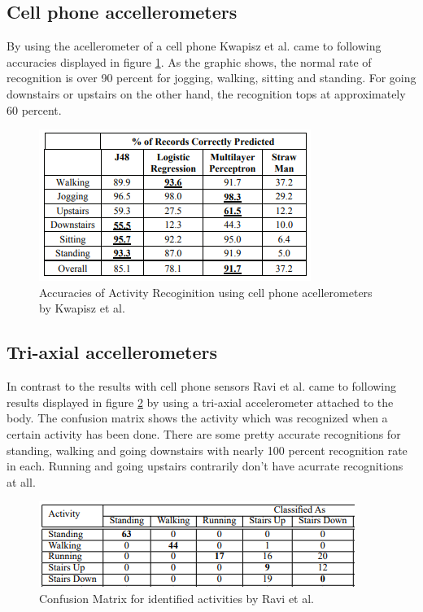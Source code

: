 \documentclass[conference]{IEEEtran}
\begin{document}
\subsection{Cell phone accellerometers}
By using the acellerometer of a cell phone Kwapisz et al. came to following accuracies displayed in figure \ref{fig:accurracies_cell_phone}. As the graphic shows, the normal rate of recognition is over 90 percent for jogging, walking, sitting and standing. For going downstairs or upstairs on the other hand, the recognition tops at approximately 60 percent.
\begin{figure}[!htb]
  \includegraphics[width=\linewidth]{accurracies_cell_phone.png}
  \caption{Accuracies of Activity Recoginition using cell phone acellerometers by Kwapisz et al. ~\cite{Kwapisz2011} }
  \label{fig:accurracies_cell_phone}
\end{figure}
\newpage
\subsection{Tri-axial accellerometers}
In contrast to the results with cell phone sensors Ravi et al. came to following results displayed in figure \ref{fig:tri_axial_data}  by using a tri-axial accelerometer attached to the body.
The confusion matrix shows the activity which was recognized when a certain activity has been done. There are some pretty accurate recognitions for standing, walking and going downstairs with nearly 100 percent recognition rate in each. Running and going upstairs contrarily don't have acurrate recognitions at all.
\begin{figure}[!htb]
  \includegraphics[width=\linewidth]{tri_axial_data.png}
  \caption{Confusion Matrix for identified activities  by Ravi et al. ~\cite{Ravi2005} }
  \label{fig:tri_axial_data}
\end{figure}
\end{document}
